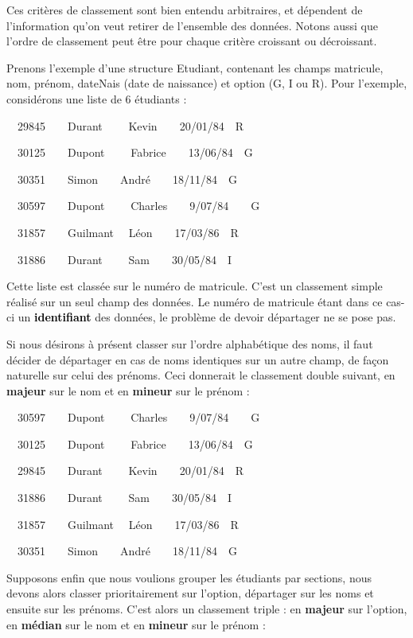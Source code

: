 {
Ces critères de classement sont bien entendu arbitraires, et dépendent
de l’information qu’on veut retirer de l’ensemble des données. Notons
aussi que l’ordre de classement peut être pour chaque critère croissant
ou décroissant.}

{
Prenons l’exemple d’une structure Etudiant, contenant les champs
matricule, nom, prénom, dateNais (date de naissance) et option (G, I ou
R). Pour l’exemple, considérons une liste de 6 étudiants :}

{
\ \ \textsf{29845\ \ \ \ Durant \ \ \ \ Kevin\ \ \ \ 20/01/84\ \ R}}

{\sffamily
\ \ 30125\ \ \ \ Dupont \ \ \ \ Fabrice\ \ \ \ 13/06/84\ \ G}

{\sffamily
\ \ 30351\ \ \ \ Simon\ \ \ \ André\ \ \ \ 18/11/84\ \ G}

{\sffamily
\ \ 30597\ \ \ \ Dupont \ \ \ \ Charles\ \ \ \ 9/07/84\ \ \ \ G}

{\sffamily
\ \ 31857\ \ \ \ Guilmant \ \ Léon\ \ \ \ 17/03/86\ \ R}

{\sffamily
\ \ 31886\ \ \ \ Durant \ \ \ \ Sam\ \ \ \ 30/05/84\ \ I}

{
Cette liste est classée sur le numéro de matricule. C’est un classement
simple réalisé sur un seul champ des données. Le numéro de matricule
étant dans ce cas-ci un \textbf{\textcolor{black}{identifiant}} des
données, le problème de devoir départager ne se pose pas.}

{
Si nous désirons à présent classer sur l’ordre alphabétique des noms, il
faut décider de départager en cas de noms identiques sur un autre
champ, de façon naturelle sur celui des prénoms. Ceci donnerait le
classement double suivant, en \textbf{majeur} sur le nom et en
\textbf{mineur} sur le prénom :}

{\sffamily
\ \ 30597\ \ \ \ Dupont \ \ \ \ Charles\ \ \ \ 9/07/84\ \ \ \ G}

{\sffamily
\ \ 30125\ \ \ \ Dupont \ \ \ \ Fabrice\ \ \ \ 13/06/84\ \ G}

{\sffamily
\ \ 29845\ \ \ \ Durant \ \ \ \ Kevin\ \ \ \ 20/01/84\ \ R}

{\sffamily
\ \ 31886\ \ \ \ Durant \ \ \ \ Sam\ \ \ \ 30/05/84\ \ I}

{\sffamily
\ \ 31857\ \ \ \ Guilmant \ \ Léon\ \ \ \ 17/03/86\ \ R}

{\sffamily
\ \ 30351\ \ \ \ Simon\ \ \ \ André\ \ \ \ 18/11/84\ \ G}

{
Supposons enfin que nous voulions grouper les étudiants par sections,
nous devons alors classer prioritairement sur l’option, départager sur
les noms et ensuite sur les prénoms. C’est alors un classement triple :
en \textbf{majeur} sur l’option, en \textbf{médian} sur le nom et en
\textbf{mineur} sur le prénom : }

